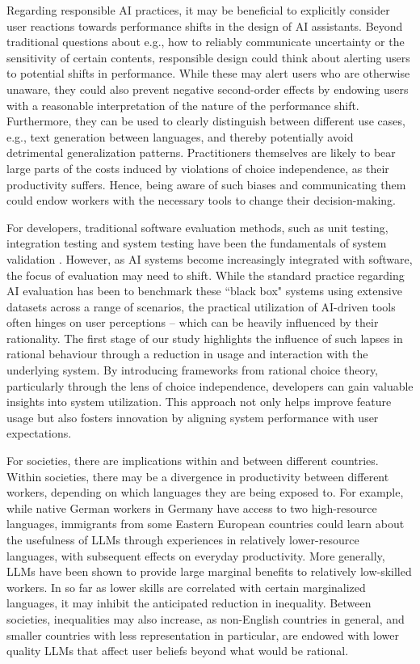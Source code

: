 Regarding responsible AI practices, it may be beneficial to explicitly consider user reactions towards performance shifts in the design of AI assistants. Beyond traditional questions about e.g., how to reliably communicate uncertainty or the sensitivity of certain contents, responsible design could think about alerting users to potential shifts in performance. While these may alert users who are otherwise unaware, they could also prevent negative second-order effects by endowing users with a reasonable interpretation of the nature of the performance shift. Furthermore, they can be used to clearly distinguish between different use cases, e.g., text generation between languages, and thereby potentially avoid detrimental generalization patterns. Practitioners themselves are likely to bear large parts of the costs induced by violations of choice independence, as their productivity suffers. Hence, being aware of such biases and communicating them could endow workers with the necessary tools to change their decision-making.

For developers, traditional software evaluation methods, such as unit testing, integration testing and system testing have been the fundamentals of system validation \cite{jamil2016software}. However, as AI systems become increasingly integrated with software, the focus of evaluation may need to shift. While the standard practice regarding AI evaluation has been to benchmark these ``black box" systems using extensive datasets across a range of scenarios, the practical utilization of AI-driven tools often hinges on user perceptions -- which can be heavily influenced by their rationality. The first stage of our study highlights the influence of such lapses in rational behaviour through a reduction in usage and interaction with the underlying system. By introducing frameworks from rational choice theory, particularly through the lens of choice independence, developers can gain valuable insights into system utilization. This approach not only helps improve feature usage but also fosters innovation by aligning system performance with user expectations.

For societies, there are implications within and between different countries. Within societies, there may be a divergence in productivity between different workers, depending on which languages they are being exposed to. For example, while native German workers in Germany have access to two high-resource languages, immigrants from some Eastern European countries could learn about the usefulness of LLMs through experiences in relatively lower-resource languages, with subsequent effects on everyday productivity. More generally, LLMs have been shown to provide large marginal benefits to relatively low-skilled workers. In so far as lower skills are correlated with certain marginalized languages, it may inhibit the anticipated reduction in inequality. Between societies, inequalities may also increase, as non-English countries in general, and smaller countries with less representation in particular, are endowed with lower quality LLMs that affect user beliefs beyond what would be rational.




